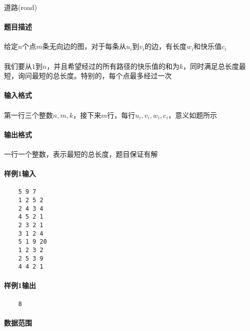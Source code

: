 \documentclass[UTF8]{ctexart}
\begin{document}
\clearpage


\begin{center}
    \large{道路(road)}
\end{center}
\paragraph{题目描述}
\paragraph{}给定$n$个点$m$条无向边的图，对于每条从$u_i$到$v_i$的边，有长度$w_i$和快乐值$c_i$
\paragraph{}我们要从$1$到$n$，并且希望经过的所有路径的快乐值的和为$k$，同时满足总长度最短，询问最短的总长度。特别的，每个点最多经过一次
\paragraph{输入格式}
\paragraph{}第一行三个整数$n,m,k$，接下来$m$行，每行$u_i,v_i,w_i,c_i$，意义如题所示
\paragraph{输出格式}
\paragraph{}一行一个整数，表示最短的总长度，题目保证有解
\paragraph{样例1输入}
\begin{lstlisting}
    5 9 7
    1 2 5 2
    2 4 3 4
    4 5 2 1
    2 3 2 1
    3 1 2 4
    5 1 9 20
    1 2 3 2
    2 5 3 9
    4 4 2 1
\end{lstlisting}
\paragraph{样例1输出}
\begin{lstlisting}
    8
\end{lstlisting}

\clearpage

\paragraph{数据范围}
\end{document}

